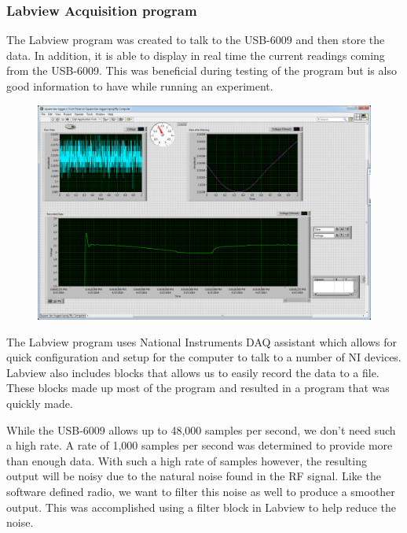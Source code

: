 \subsubsection{Labview Acquisition program}

The Labview program was created to talk to the USB-6009 and then store the data.  In addition, it is able to display in real time the current readings coming from the USB-6009.  This was beneficial during testing of the program but is also good information to have while running an experiment.  

{\begin{figure}[h!tb] \centering
\includegraphics[width=\textwidth]{Images/labviewGUI.png}
\label{labviewgui}
\end{figure}
}

The Labview program uses National Instruments DAQ assistant which allows for quick configuration and setup for the computer to talk to a number of NI devices.  Labview also includes blocks that allows us to easily record the data to a file.  These blocks made up most of the program and resulted in a program that was quickly made.  

While the USB-6009 allows up to 48,000 samples per second, we don't need such a high rate.  A rate of 1,000 samples per second was determined to provide more than enough data.  With such a high rate of samples however, the resulting output will be noisy due to the natural noise found in the RF signal.  Like the software defined radio, we want to filter this noise as well to produce a smoother output.  This was accomplished using a filter block in Labview to help reduce the noise.

